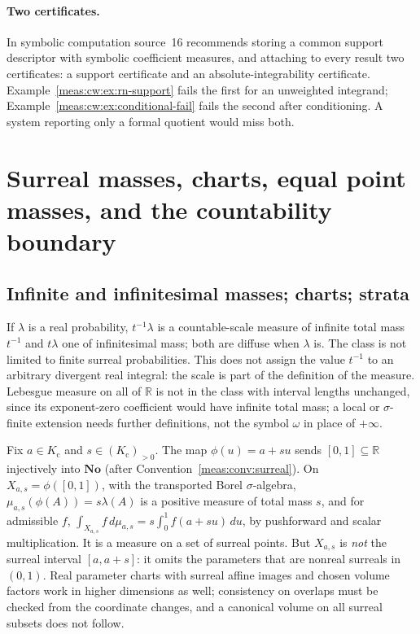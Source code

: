\documentclass[11pt]{article}
\numberwithin{equation}{section}
\theoremstyle{definition}
\theoremstyle{remark}
\newcommand{\R}{\mathbb R}
\newcommand{\No}{\mathbf{No}}
\newcommand{\Kc}{K_{\mathrm c}}
\begin{document}
\paragraph{Two certificates.} In symbolic computation source~16 recommends
storing a common support descriptor with symbolic coefficient measures, and
attaching to every result two certificates: a support certificate and an
absolute-integrability certificate.
Example~\ref{meas:cw:ex:rn-support} fails the first for an unweighted integrand;
Example~\ref{meas:cw:ex:conditional-fail} fails the second after conditioning. A
system reporting only a formal quotient would miss both.

\section{Surreal masses, charts, equal point masses, and the countability
boundary}\label{meas:cw:sec:boundary}

\subsection{Infinite and infinitesimal masses; charts; strata}

If $\lambda$ is a real probability, $t^{-1}\lambda$ is a countable-scale measure of
infinite total mass $t^{-1}$ and $t\lambda$ one of infinitesimal mass; both are
diffuse when $\lambda$ is. The class is not limited to finite surreal
probabilities. This does not assign the value $t^{-1}$ to an arbitrary divergent
real integral: the scale is part of the definition of the measure. Lebesgue
measure on all of $\R$ is not in the class with interval lengths unchanged, since
its exponent-zero coefficient would have infinite total mass; a local or
$\sigma$-finite extension needs further definitions, not the symbol $\omega$ in place
of $+\infty$.

Fix $a\in\Kc$ and $s\in(\Kc)_{>0}$. The map $\phi(u)=a+su$ sends $[0,1]\subseteq\R$
injectively into $\No$ (after Convention~\ref{meas:conv:surreal}). On
$X_{a,s}=\phi([0,1])$, with the transported Borel $\sigma$-algebra,
$\mu_{a,s}(\phi(A))=s\lambda(A)$ is a positive measure of total mass $s$, and for
admissible $f$, $\int_{X_{a,s}}f\,d\mu_{a,s}=s\int_0^1f(a+su)\,du$, by pushforward and
scalar multiplication. It is a measure on a set of surreal points. But $X_{a,s}$ is
\emph{not} the surreal interval $[a,a+s]$: it omits the parameters that are
nonreal surreals in $(0,1)$. Real parameter charts with surreal affine images
and chosen volume factors work in higher dimensions as well; consistency on
overlaps must be checked from the coordinate changes, and a canonical volume on
all surreal subsets does not follow.
\end{document}
